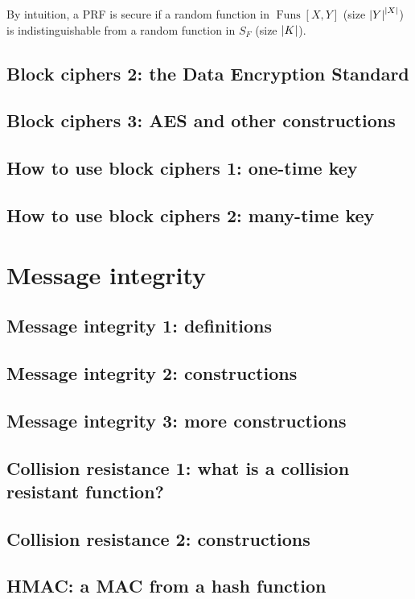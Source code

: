\documentclass[10pt,a4paper]{report}
\begin{document}
By intuition, a PRF is secure if a random function in $\operatorname{Funs}[X, Y]$ (size
$\abs{Y}^{\abs{X}}$) is indistinguishable from a random function in $S_F$ (size $\abs{K}$).



\section{Block ciphers 2: the Data Encryption Standard}
\section{Block ciphers 3: AES and other constructions}
\section{How to use block ciphers 1: one-time key}
\section{How to use block ciphers 2: many-time key}

\chapter{Message integrity}

\section{Message integrity 1: definitions}
\section{Message integrity 2: constructions}
\section{Message integrity 3: more constructions}
\section{Collision resistance 1: what is a collision resistant function?}
\section{Collision resistance 2: constructions}
\section{HMAC: a MAC from a hash function}
\end{document}
